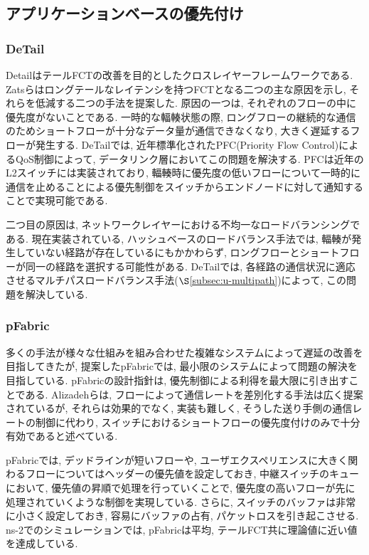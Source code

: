 \subsection{アプリケーションベースの優先付け}
\label{subsec:ap_priority}

\subsubsection{DeTail}
Detail\cite{detail}はテールFCTの改善を目的としたクロスレイヤーフレームワークである. 
Zatsらはロングテールなレイテンシを持つFCTとなる二つの主な原因を示し, それらを低減する二つの手法を提案した. 
原因の一つは, それぞれのフローの中に優先度がないことである. 
一時的な輻輳状態の際, ロングフローの継続的な通信のためショートフローが十分なデータ量が通信できなくなり, 大きく遅延するフローが発生する. 
DeTailでは, 近年標準化されたPFC(Priority Flow Control)によるQoS制御によって, データリンク層においてこの問題を解決する. 
PFCは近年のL2スイッチには実装されており,
輻輳時に優先度の低いフローについて一時的に通信を止めることによる優先制御をスイッチからエンドノードに対して通知することで実現可能である. 

二つ目の原因は, ネットワークレイヤーにおける不均一なロードバランシングである. 
現在実装されている, ハッシュベースのロードバランス手法では, 輻輳が発生していない経路が存在しているにもかかわらず,
ロングフローとショートフローが同一の経路を選択する可能性がある. 
DeTailでは, 各経路の通信状況に適応させるマルチパスロードバランス手法($\S$\ref{subsec:u-multipath})によって,
この問題を解決している.

\subsubsection{pFabric}
多くの手法が様々な仕組みを組み合わせた複雑なシステムによって遅延の改善を目指してきたが, 提案したpFabric\cite{p_fab}では,
最小限のシステムによって問題の解決を目指している. 
pFabricの設計指針は, 優先制御による利得を最大限に引き出すことである. 
Alizadehらは, フローによって通信レートを差別化する手法は広く提案されているが, それらは効果的でなく, 実装も難しく,
そうした送り手側の通信レートの制御に代わり, スイッチにおけるショートフローの優先度付けのみで十分有効であると述べている.

pFabricでは, デッドラインが短いフローや, ユーザエクスペリエンスに大きく関わるフローについてはヘッダーの優先値を設定しておき,
中継スイッチのキューにおいて, 優先値の昇順で処理を行っていくことで, 優先度の高いフローが先に処理されていくような制御を実現している. 
さらに, スイッチのバッファは非常に小さく設定しておき, 容易にバッファの占有, パケットロスを引き起こさせる. 
ns-2でのシミュレーションでは, pFabricは平均, テールFCT共に理論値に近い値を達成している. 

